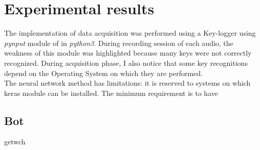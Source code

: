 \chapter{Experimental results}
The implementation of data acquisition was performed using a Key-logger using \textit{pynput} module of in \textit{python3}. During recording session of each audio, the weakness of this module was highlighted because many keys were not correctly recognized. During acquisition phase, I also notice that some key recognitions depend on the Operating System on which they are performed.\\
The neural network method has limitations: it is reserved to systems on which keras module can be installed. The minimum requirement is to have 

\section{Bot}
getwch

\section{}